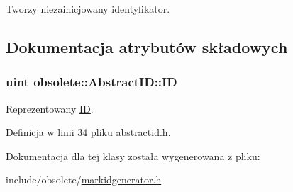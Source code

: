 Tworzy niezainicjowany identyfikator. 



\subsection{Dokumentacja atrybutów składowych}
\hypertarget{classobsolete_1_1AbstractID_a5f67fa1c7d96085f0ef41193b60b570c}{
\subsubsection[{ID}]{\setlength{\rightskip}{0pt plus 5cm}uint {\bf obsolete::AbstractID::ID}}}
\label{classobsolete_1_1AbstractID_a5f67fa1c7d96085f0ef41193b60b570c}


Reprezentowany \hyperlink{classobsolete_1_1ID}{ID}. 



Definicja w linii 34 pliku abstractid.h.



Dokumentacja dla tej klasy została wygenerowana z pliku:\begin{DoxyCompactItemize}
\item 
include/obsolete/\hyperlink{markidgenerator_8h}{markidgenerator.h}\end{DoxyCompactItemize}
